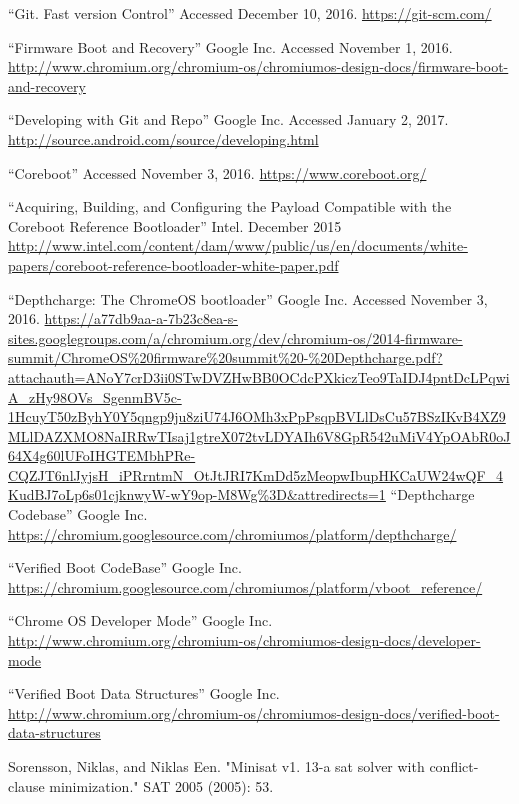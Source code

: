 \documentclass[../report.tex]{subfiles}
\begin{document}
\begin{singlespace}
\begin{flushleft}
\begin{footnotesize}
\begin{thebibliography}{\kern\bibindent}
        ``Git. Fast version Control'' Accessed December 10, 2016. \url{https://git-scm.com/}

    ``Firmware Boot and Recovery'' Google Inc. Accessed November 1, 2016. \url{http://www.chromium.org/chromium-os/chromiumos-design-docs/firmware-boot-and-recovery}

    ``Developing with Git and Repo'' Google Inc. Accessed January 2, 2017. \url{http://source.android.com/source/developing.html}

    ``Coreboot'' Accessed November 3, 2016. \url{https://www.coreboot.org/}

    ``Acquiring, Building, and Configuring the Payload Compatible with the Coreboot Reference Bootloader'' Intel. December 2015 \url{http://www.intel.com/content/dam/www/public/us/en/documents/white-papers/coreboot-reference-bootloader-white-paper.pdf}

    ``Depthcharge: The ChromeOS bootloader'' Google Inc. Accessed November 3, 2016.
    \url{https://a77db9aa-a-7b23c8ea-s-sites.googlegroups.com/a/chromium.org/dev/chromium-os/2014-firmware-summit/ChromeOS\%20firmware\%20summit\%20-\%20Depthcharge.pdf?attachauth=ANoY7crD3ii0STwDVZHwBB0OCdcPXkiczTeo9TaIDJ4pntDcLPqwiA_zHy98OVs_SgenmBV5c-1HcuyT50zByhY0Y5qngp9ju8ziU74J6OMh3xPpPsqpBVLlDsCu57BSzIKvB4XZ9MLlDAZXMO8NaIRRwTIsaj1gtreX072tvLDYAIh6V8GpR542uMiV4YpOAbR0oJ64X4g60lUFoIHGTEMbhPRe-CQZJT6nlJyjsH_iPRrntmN_OtJtJRI7KmDd5zMeopwIbupHKCaUW24wQF_4KudBJ7oLp6s01cjknwyW-wY9op-M8Wg\%3D&attredirects=1}
    ``Depthcharge Codebase'' Google Inc. \url{https://chromium.googlesource.com/chromiumos/platform/depthcharge/}

    ``Verified Boot CodeBase'' Google Inc. \url{https://chromium.googlesource.com/chromiumos/platform/vboot_reference/}

    ``Chrome OS Developer Mode'' Google Inc. \url{http://www.chromium.org/chromium-os/chromiumos-design-docs/developer-mode}

    ``Verified Boot Data Structures'' Google Inc. \url{http://www.chromium.org/chromium-os/chromiumos-design-docs/verified-boot-data-structures}

    Sorensson, Niklas, and Niklas Een. "Minisat v1. 13-a sat solver with conflict-clause minimization." SAT 2005 (2005): 53.
\end{thebibliography}
\end{footnotesize}
\end{flushleft}
\end{singlespace}
\endgroup
\end{document}
